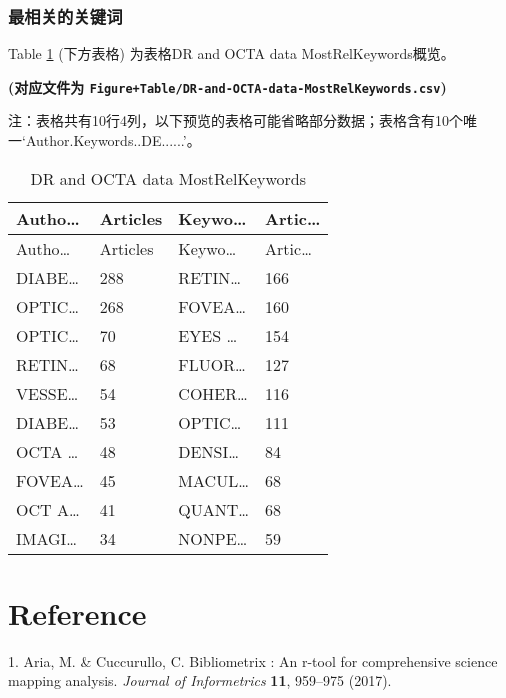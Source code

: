 \documentclass[
]{article}
\newenvironment{cslreferences}%
  {}%
  {\par}
\begin{document}
\hypertarget{ux6700ux76f8ux5173ux7684ux5173ux952eux8bcd}{%
\subsubsection{最相关的关键词}\label{ux6700ux76f8ux5173ux7684ux5173ux952eux8bcd}}

Table \ref{tab:DR-and-OCTA-data-MostRelKeywords} (下方表格) 为表格DR and OCTA data MostRelKeywords概览。

\textbf{(对应文件为 \texttt{Figure+Table/DR-and-OCTA-data-MostRelKeywords.csv})}

\begin{center}\begin{tcolorbox}[colback=gray!10, colframe=gray!50, width=0.9\linewidth, arc=1mm, boxrule=0.5pt]注：表格共有10行4列，以下预览的表格可能省略部分数据；表格含有10个唯一`Author.Keywords..DE......'。
\end{tcolorbox}
\end{center}

\begin{longtable}[]{@{}llll@{}}
\caption{\label{tab:DR-and-OCTA-data-MostRelKeywords}DR and OCTA data MostRelKeywords}\tabularnewline
\toprule
Autho\ldots{} & Articles & Keywo\ldots{} & Artic\ldots{}\tabularnewline
\midrule
\endfirsthead
\toprule
Autho\ldots{} & Articles & Keywo\ldots{} & Artic\ldots{}\tabularnewline
\midrule
\endhead
DIABE\ldots{} & 288 & RETIN\ldots{} & 166\tabularnewline
OPTIC\ldots{} & 268 & FOVEA\ldots{} & 160\tabularnewline
OPTIC\ldots{} & 70 & EYES \ldots{} & 154\tabularnewline
RETIN\ldots{} & 68 & FLUOR\ldots{} & 127\tabularnewline
VESSE\ldots{} & 54 & COHER\ldots{} & 116\tabularnewline
DIABE\ldots{} & 53 & OPTIC\ldots{} & 111\tabularnewline
OCTA \ldots{} & 48 & DENSI\ldots{} & 84\tabularnewline
FOVEA\ldots{} & 45 & MACUL\ldots{} & 68\tabularnewline
OCT A\ldots{} & 41 & QUANT\ldots{} & 68\tabularnewline
IMAGI\ldots{} & 34 & NONPE\ldots{} & 59\tabularnewline
\bottomrule
\end{longtable}

\hypertarget{bibliography}{%
\section*{Reference}\label{bibliography}}

\hypertarget{refs}{}
\begin{cslreferences}
\leavevmode\hypertarget{ref-BibliometrixAria2017}{}%
1. Aria, M. \& Cuccurullo, C. Bibliometrix : An r-tool for comprehensive science mapping analysis. \emph{Journal of Informetrics} \textbf{11}, 959--975 (2017).
\end{cslreferences}
\end{document}
